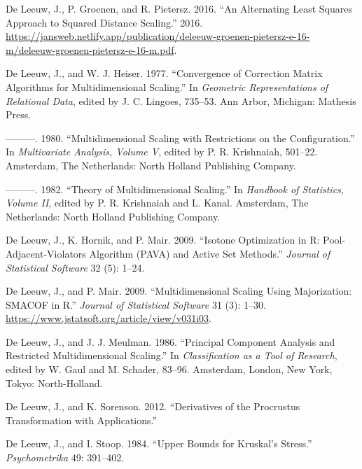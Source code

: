 \documentclass[
  12pt,
  letterpaper,
  DIV=11,
  numbers=noendperiod]{scrreprt}
\newlength{\cslhangindent}
\newenvironment{CSLReferences}[2] %
 {\begin{list}{}{%
  \setlength{\itemindent}{0pt}
  \setlength{\leftmargin}{0pt}
  \setlength{\parsep}{0pt}
  \ifodd #1
   \setlength{\leftmargin}{\cslhangindent}
   \setlength{\itemindent}{-1\cslhangindent}
  \fi
  \setlength{\itemsep}{#2\baselineskip}}}
 {\end{list}}
\theoremstyle{remark}
\begin{document}
\begin{CSLReferences}{1}{0}
De Leeuw, J., P. Groenen, and R. Pietersz. 2016. {``An Alternating Least
Squares Approach to Squared Distance Scaling.''} 2016.
\url{https://jansweb.netlify.app/publication/deleeuw-groenen-pietersz-e-16-m/deleeuw-groenen-pietersz-e-16-m.pdf}.

De Leeuw, J., and W. J. Heiser. 1977. {``Convergence of Correction
Matrix Algorithms for Multidimensional Scaling.''} In \emph{Geometric
Representations of Relational Data}, edited by J. C. Lingoes, 735--53.
Ann Arbor, Michigan: Mathesis Press.

---------. 1980. {``Multidimensional Scaling with Restrictions on the
Configuration.''} In \emph{Multivariate Analysis, Volume {V}}, edited by
P. R. Krishnaiah, 501--22. Amsterdam, The Netherlands: North Holland
Publishing Company.

---------. 1982. {``Theory of Multidimensional Scaling.''} In
\emph{Handbook of Statistics, Volume {II}}, edited by P. R. Krishnaiah
and L. Kanal. Amsterdam, The Netherlands: North Holland Publishing
Company.

De Leeuw, J., K. Hornik, and P. Mair. 2009. {``{Isotone Optimization in
R: Pool-Adjacent-Violators Algorithm (PAVA) and Active Set Methods}.''}
\emph{Journal of Statistical Software} 32 (5): 1--24.

De Leeuw, J., and P. Mair. 2009. {``{Multidimensional Scaling Using
Majorization: SMACOF in R}.''} \emph{Journal of Statistical Software} 31
(3): 1--30. \url{https://www.jstatsoft.org/article/view/v031i03}.

De Leeuw, J., and J. J. Meulman. 1986. {``Principal Component Analysis
and Restricted Multidimensional Scaling.''} In \emph{Classification as a
Tool of Research}, edited by W. Gaul and M. Schader, 83--96. Amsterdam,
London, New York, Tokyo: North-Holland.

De Leeuw, J., and K. Sorenson. 2012. {``{Derivatives of the Procrustus
Transformation with Applications}.''}

De Leeuw, J., and I. Stoop. 1984. {``Upper Bounds for Kruskal's
Stress.''} \emph{Psychometrika} 49: 391--402.


\end{CSLReferences}
\end{document}
